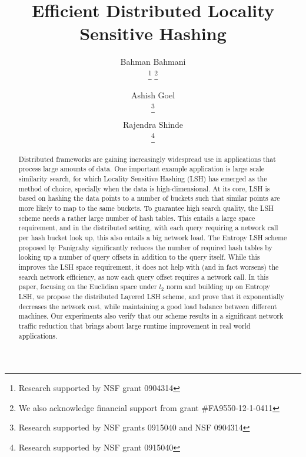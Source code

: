 \documentclass{acm_proc_article-sp}
\numberwithin{equation}{section}
\numberwithin{figure}{section}
\newcommand*\samethanks[1][\value{footnote}]{\footnotemark[#1]}
\begin{document}
\title{Efficient Distributed Locality Sensitive Hashing}
\author{
\alignauthor
Bahman Bahmani \\
\thanks{Research supported by NSF grant 0904314}
\thanks{We also acknowledge financial support from grant \#FA9550-12-1-0411}
\and
\alignauthor
Ashish Goel\\
\thanks{Research supported by NSF grants 0915040 and NSF 0904314}
\samethanks[2]
\and
\alignauthor
Rajendra Shinde\\
\thanks{Research supported by NSF grant 0915040}
\samethanks[2]
}
\maketitle
\begin{abstract}
Distributed frameworks are gaining increasingly widespread use in applications that process large amounts of data. One important example application is large scale similarity search, for which Locality Sensitive Hashing (LSH) has emerged as the method of choice, specially when the data is high-dimensional. At its core, LSH is based on hashing the data points to a number of buckets such that similar points are more likely to map to the same buckets. To guarantee high search quality, the LSH scheme needs a rather large number of hash tables. This entails a large space requirement, and in the distributed setting, with each query requiring a network call per hash bucket look up, this also entails a big network load. The Entropy LSH scheme proposed by Panigrahy significantly reduces the number of required hash tables by looking up a number of query offsets in addition to the query itself. While this improves the LSH space requirement, it does not help with (and in fact worsens) the search network efficiency, as now each query offset requires a network call. In this paper, focusing on the Euclidian space under $l_2$ norm and building up on Entropy LSH, we propose the distributed Layered LSH scheme, and prove that it exponentially decreases the network cost, while maintaining a good load balance between different machines. Our experiments also verify that our scheme results in a significant network traffic reduction that brings about large runtime improvement in real world applications.
\end{abstract}
\end{document}

